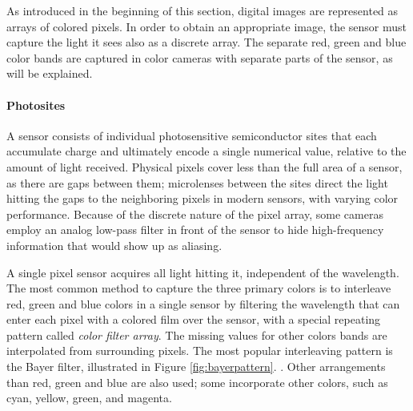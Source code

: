 
As introduced in the beginning of this section, digital images are represented as arrays of colored pixels.
In order to obtain an appropriate image, the sensor must capture the light it sees also as a discrete array.
The separate red, green and blue color bands are captured in color cameras with separate parts of the sensor, as will be explained.

\paragraph{Photosites}
A sensor consists of individual photosensitive semiconductor sites that each accumulate charge and ultimately encode a single numerical value, relative to the amount of light received.
Physical pixels cover less than the full area of a sensor, as there are gaps between them;
microlenses between the sites direct the light hitting the gaps to the neighboring pixels in modern sensors, with varying color performance. \cite{el2005cmos}
Because of the discrete nature of the pixel array, some cameras employ an analog low-pass filter in front of the sensor to hide high-frequency information that would show up as aliasing.
\cite{nakamura2005image}

A single pixel sensor acquires all light hitting it, independent of the wavelength.
The most common method to capture the three primary colors is to interleave red, green and blue colors in a single sensor by filtering the wavelength that can enter each pixel with a colored film over the sensor, with a special repeating pattern called \emph{color filter array}.
The missing values for other colors bands are interpolated from surrounding pixels.
The most popular interleaving pattern is the Bayer filter, illustrated in Figure \ref{fig:bayerpattern}.
\cite{szeliski10vision}.
Other arrangements than red, green and blue are also used; some incorporate other colors, such as cyan, yellow, green, and magenta.
\cite{park2003implementing}



